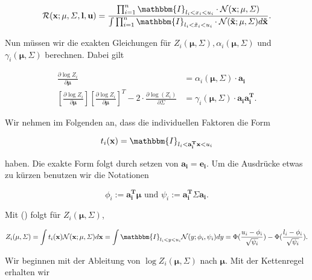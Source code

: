 \documentclass[12pt,a4paper]{scrartcl}
\numberwithin{equation}{section}
\begin{document}
\begin{equation}
 \mathcal{R}(\mathbf{x;\mu, \varSigma, l, u}) = \frac{ \prod_{i = 1}^n \mathbbm{I}_{l_i < x_i < u_i} \cdot \mathcal{N}(\mathbf{x;\mu,\varSigma})}{\int \prod_{i=1}^n \mathbbm{I}_{l_i< \tilde x_i < u_i } \cdot \mathcal{N}(\mathbf{\tilde x; \mu, \varSigma}) d \mathbf{\tilde x}}. 
\end{equation}

Nun müssen wir die exakten Gleichungen für $Z_i(\mathbf{\mu, \varSigma}), \alpha_i(\mathbf{\mu, \varSigma})$ und $\gamma_i(\mathbf{\mu,\varSigma})$ berechnen.
Dabei gilt

\begin{equation}
 \begin{split}
  \frac{\partial \log{Z_i}}{\partial \mathbf{\mu}} &= \alpha_i(\mathbf{\mu, \varSigma}) \cdot \mathbf{a_i} \\
  \left [ \frac{\partial \log{Z_i} }{\partial \mathbf{\mu}} \right ] \left [ \frac{\partial \log{Z_i}}{\partial \mathbf{\mu}}\right ]^T - 2 \cdot \frac{\partial \log(Z_i)}{\partial \mathbf{\varSigma}} &= \gamma_i(\mathbf{\mu, \varSigma}) \cdot \mathbf{a_i a_i^T}.
 \end{split}
\end{equation}

Wir nehmen im Folgenden an, dass die individuellen Faktoren die Form 

\begin{equation}
 t_i(\mathbf{x}) = \mathbbm{I}_{l_i < \mathbf{a_i^T x} < u_i}
\end{equation}

haben. Die exakte Form folgt durch setzen von $\mathbf{a_i = e_i}$. Um die Ausdrücke etwas zu kürzen 
benutzen wir die Notationen 

\begin{equation}
 \phi_i := \mathbf{a_i^T \mu} \text{	und	} \psi_i := \mathbf{a_i^T \varSigma a_i}.
\end{equation}

Mit () folgt für $Z_i(\mathbf{\mu,\varSigma})$, 

\begin{equation}
 Z_i(\mathbf{\mu, \varSigma}) = \int t_i(\mathbf{x}) \mathcal{N}(\mathbf{x; \mu, \varSigma}) d \mathbf{x} = \int \mathbbm{I}_{l_i < y < u_i} \mathcal{N}(y; \phi_i, \psi_i) dy = \Phi(\frac{u_i - \phi_i}{\sqrt{\psi_i}}) - \Phi(\frac{l_i - \phi_i}{\sqrt{\psi_i}}).
\end{equation}

Wir beginnen mit der Ableitung von $\log Z_i(\mathbf{\mu, \varSigma})$ nach $\mathbf{\mu}$. Mit der Kettenregel erhalten wir
\end{document}
